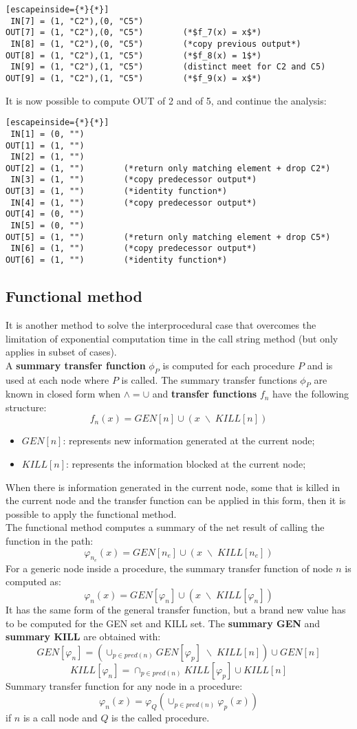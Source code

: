 \documentclass[a4paper, 10pt, titlepage]{article}
\begin{document}
\begin{lstlisting}[escapeinside={*}{*}]
 IN[7] = (1, "C2"),(0, "C5")
OUT[7] = (1, "C2"),(0, "C5")		(*$f_7(x) = x$*)
 IN[8] = (1, "C2"),(0, "C5")		(*copy previous output*)
OUT[8] = (1, "C2"),(1, "C5")		(*$f_8(x) = 1$*)
 IN[9] = (1, "C2"),(1, "C5")		(distinct meet for C2 and C5)
OUT[9] = (1, "C2"),(1, "C5")		(*$f_9(x) = x$*)
\end{lstlisting}
It is now possible to compute OUT of 2 and of 5, and continue the analysis:
\begin{lstlisting}[escapeinside={*}{*}]
 IN[1] = (0, "")
OUT[1] = (1, "")
 IN[2] = (1, "")
OUT[2] = (1, "")		(*return only matching element + drop C2*)
 IN[3] = (1, "")		(*copy predecessor output*)
OUT[3] = (1, "")		(*identity function*)
 IN[4] = (1, "")		(*copy predecessor output*)
OUT[4] = (0, "")
 IN[5] = (0, "")
OUT[5] = (1, "")		(*return only matching element + drop C5*)
 IN[6] = (1, "")		(*copy predecessor output*)
OUT[6] = (1, "")		(*identity function*)
\end{lstlisting}


\subsection{Functional method}
It is another method to solve the interprocedural case that overcomes the limitation of exponential computation time in the call string method (but only applies in subset of cases).\medskip\\
A \textbf{summary transfer function} $\phi_P$ is computed for each procedure $P$ and is used at each node where $P$ is called.
The summary transfer functions $\phi_P$ are known in closed form when $\wedge = \cup$ and \textbf{transfer functions} $f_n$ have the following structure:
$$f_n(x) = GEN[n] \cup (x \; \backslash \; KILL[n])$$
\begin{itemize}
\item $GEN[n]$: represents new information generated at the current node;
\item $KILL[n]$: represents the information blocked at the current node;
\end{itemize}
When there is information generated in the current node, some that is killed in the current node and the transfer function can be applied in this form, then it is possible to apply the functional method. \medskip\\
The functional method computes a summary of the net result of calling the function in the path:
$$\varphi_{n_{e}}(x) =  GEN[n_e] \cup (x \; \backslash \; KILL[n_e])$$
For a generic node inside a procedure, the summary transfer function of node $n$ is computed as:
$$\varphi_{n}(x) =  GEN[\varphi_{n}] \cup (x \; \backslash \; KILL[\varphi_{n}])$$
It has the same form of the general transfer function, but a brand new value has to be computed for the GEN set and KILL set. The \textbf{summary GEN} and \textbf{summary KILL} are obtained with:
$$GEN[\varphi_{n}] = ( \cup_{p \in pred(n)} GEN[\varphi_{p}] \; \backslash \; KILL[n]) \cup GEN[n]$$
$$KILL[\varphi_{n}] = \cap_{p \in pred(n)} KILL[\varphi_{p}] \cup KILL[n]$$ 
Summary transfer function for any node in a procedure:
$$\varphi_{n}(x) =  \varphi_{Q}	 ( \cup_{p \in pred(n)} \varphi_{p}(x))$$
if $n$ is a call node and $Q$ is the called procedure.
\end{document}
